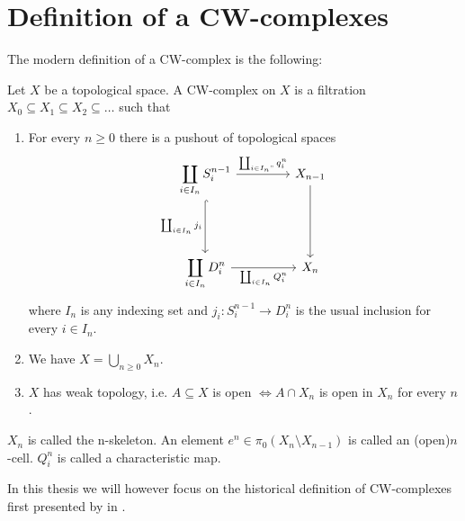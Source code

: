 \section{Definition of a CW-complexes}

The modern definition of a CW-complex is the following: 

\begin{defi}
    Let $X$ be a topological space. 
    A CW-complex on $X$ is a filtration 
    $X_0 \subseteq X_1 \subseteq X_2 \subseteq \dots$ such that 
    \begin{enumerate}[label=(\roman*)]
        \item For every $n \ge 0$ there is a pushout of topological spaces
            \[
            \begin{tikzcd}[row sep = 1.5cm, column sep = 1.5cm]
                \displaystyle \coprod_{i \in I_n}S_i^{n - 1} \arrow[r, "\coprod_{i \in I_n"}q_i^n"] \arrow[d, hook, "\coprod_{i \in I_n} j_i"'] & X_{n- 1} \arrow[d] \\ 
                \displaystyle \coprod_{i \in I_n}D_i^n \arrow[r, "\coprod_{i \in I_n} Q_i^n"'] & X_n
            \end{tikzcd}
            \] 
            where $I_n$ is any indexing set and $j_i \colon S_i^{n - 1} \to D_i^n$ is the usual inclusion for every $i \in I_n$.
        \item We have $X = \bigcup_{n \ge 0} X_n$. 
        \item $X$ has weak topology, i.e. $A \subseteq X$ is open $\iff A \cap X_n$ is open in $X_n$ for every $n$.
    \end{enumerate}
    $X_n$ is called the n-skeleton. 
    An element $e^n \in \pi_0 (X_n \setminus X_{n - 1})$ is called an (open)$n$-cell. 
    $Q_i^n$ is called a characteristic map.
\end{defi}

In this thesis we will however focus on the historical definition of CW-complexes first presented by  in \cite{Whitehead2018}.

